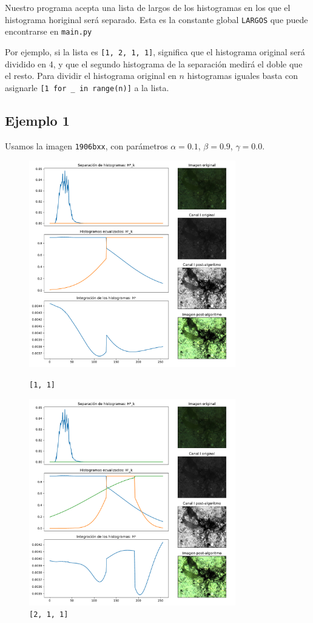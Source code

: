 Nuestro programa acepta una lista de largos de los histogramas en los que el histograma horiginal será separado.
Esta es la constante global \texttt{LARGOS} que puede encontrarse en \texttt{main.py}

Por ejemplo, si la lista es \texttt{[1, 2, 1, 1]}, significa que el histograma original será dividido en 4,
y que el segundo histograma de la separación medirá el doble que el resto.
Para dividir el histograma original en $n$ histogramas iguales basta con asignarle \texttt{[1 for \_ in range(n)]}
a la lista.

\subsection{Ejemplo 1}
Usamos la imagen \texttt{1906bxx}, con parámetros $\alpha = 0.1$, $\beta = 0.9$, $\gamma = 0.0$.

\begin{figure}[H]
\begin{minipage}[c]{0.48\linewidth}
  \includegraphics[height=9cm]{imgs/1906bxx-11.pdf}
  \caption{\texttt{[1, 1]}}
\end{minipage}
\hfill
\begin{minipage}[c]{0.48\linewidth}
  \includegraphics[height=9cm]{imgs/1906bxx-211.pdf}
  \caption{\texttt{[2, 1, 1]}}
\end{minipage}%
\end{figure}

